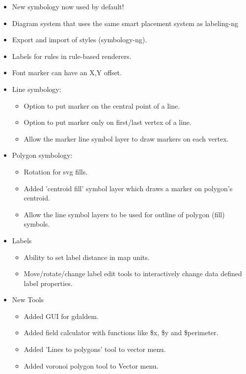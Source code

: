 \begin{itemize}[label=--]
\item New symbology now used by default!
\item Diagram system that uses the same smart placement system as labeling-ng
\item Export and import of styles (symbology-ng).
\item Labels for rules in rule-based renderers.
\item Font marker can have an X,Y offset.
\item Line symbology:
\begin{itemize}[label=--]
\item Option to put marker on the central point of a line.
\item Option to put marker only on first/last vertex of a line.
\item Allow the marker line symbol layer to draw markers on each vertex.
\end{itemize}
\item Polygon symbology:
\begin{itemize}[label=--]
\item Rotation for svg fills.
\item Added 'centroid fill' symbol layer which draws a marker on polygon's centroid.
\item Allow the line symbol layers to be used for outline of polygon (fill) symbols.
\end{itemize}
\item Labels
\begin{itemize}[label=--]
\item Ability to set label distance in map units.
\item Move/rotate/change label edit tools to interactively change data defined label properties.
\end{itemize}
\item New Tools
\begin{itemize}[label=--]
\item Added GUI for gdaldem.
\item Added field calculator with functions like \$x, \$y and \$perimeter.
\item Added 'Lines to polygons' tool to vector menu.
\item Added voronoi polygon tool to Vector menu.
\end{itemize}
\end{itemize}


